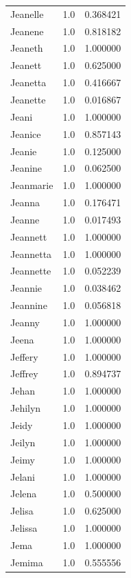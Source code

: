 \documentclass[
  letterpaper,
  DIV=11,
  numbers=noendperiod]{scrreprt}
\begin{document}
\begin{tabular}{lrr}
Jeanelle        &   1.0 &   0.368421 \\
Jeanene         &   1.0 &   0.818182 \\
Jeaneth         &   1.0 &   1.000000 \\
Jeanett         &   1.0 &   0.625000 \\
Jeanetta        &   1.0 &   0.416667 \\
Jeanette        &   1.0 &   0.016867 \\
Jeani           &   1.0 &   1.000000 \\
Jeanice         &   1.0 &   0.857143 \\
Jeanie          &   1.0 &   0.125000 \\
Jeanine         &   1.0 &   0.062500 \\
Jeanmarie       &   1.0 &   1.000000 \\
Jeanna          &   1.0 &   0.176471 \\
Jeanne          &   1.0 &   0.017493 \\
Jeannett        &   1.0 &   1.000000 \\
Jeannetta       &   1.0 &   1.000000 \\
Jeannette       &   1.0 &   0.052239 \\
Jeannie         &   1.0 &   0.038462 \\
Jeannine        &   1.0 &   0.056818 \\
Jeanny          &   1.0 &   1.000000 \\
Jeena           &   1.0 &   1.000000 \\
Jeffery         &   1.0 &   1.000000 \\
Jeffrey         &   1.0 &   0.894737 \\
Jehan           &   1.0 &   1.000000 \\
Jehilyn         &   1.0 &   1.000000 \\
Jeidy           &   1.0 &   1.000000 \\
Jeilyn          &   1.0 &   1.000000 \\
Jeimy           &   1.0 &   1.000000 \\
Jelani          &   1.0 &   1.000000 \\
Jelena          &   1.0 &   0.500000 \\
Jelisa          &   1.0 &   0.625000 \\
Jelissa         &   1.0 &   1.000000 \\
Jema            &   1.0 &   1.000000 \\
Jemima          &   1.0 &   0.555556 \\

\end{tabular}
\end{document}
